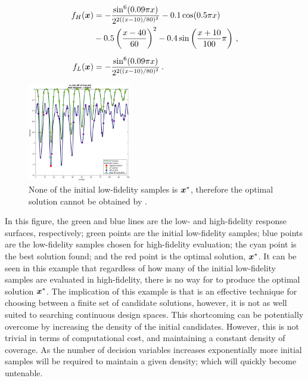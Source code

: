 \begin{align}
f_H(\boldsymbol{x}) &= -\frac{\sin^6(0.09\pi x)}{2^{2((x-10)/80)^2}}-0.1\cos(0.5\pi x)\nonumber\\
           &-0.5\left(\frac{x-40}{60}\right)^2- 0.4\sin\left(\frac{x+10}{100}\pi\right)\,,\label{eq:hf-ex}\\[0.2cm]
f_L(\boldsymbol{x}) &= -\frac{\sin^6(0.09\pi x)}{2^{2((x-10)/80)^2}}\,. \label{eq:lf-ex}
\end{align}

\begin{figure}[h!]
  \centering
  \includegraphics[width = 0.40\textwidth]{img/ex_motos.eps} 
  \caption{None of the initial low-fidelity samples is $\boldsymbol{x}^*$, therefore the optimal solution cannot be obtained by \motos{}.} 
    \label{fig:motos-example}
\end{figure}
In this figure, the green and blue lines are the low- and high-fidelity response surfaces, respectively; green points are the initial low-fidelity samples; blue points are the low-fidelity samples chosen for high-fidelity evaluation; the cyan point is the best solution found; and the red point is the optimal solution, $\boldsymbol{x}^*$. It can be seen in this example that regardless of how many of the initial low-fidelity samples are evaluated in high-fidelity, there is no way for \motos{} to produce the optimal solution $\boldsymbol{x}^*$. The implication of this example is that \motos{} is an effective technique for choosing between a finite set of candidate solutions, however, it is not as well suited to searching continuous design spaces. This shortcoming can be potentially overcome by increasing the density of the initial candidates. However, this is not trivial in terms of computational cost, and maintaining a constant density of coverage. As the number of decision variables increases exponentially more initial samples will be required to maintain a given density; which will quickly become untenable.
